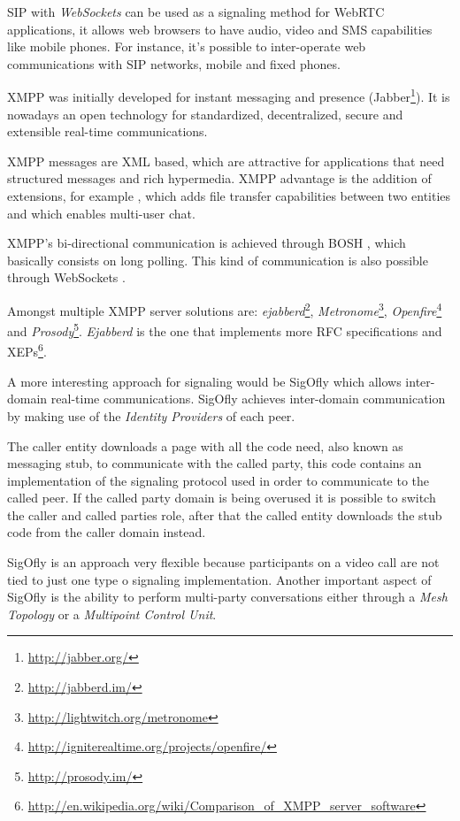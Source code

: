   \ac{SIP} with \emph{WebSockets} can be used as a signaling method for \ac{WebRTC} applications, it allows web browsers to have audio, video and \ac{SMS} capabilities like mobile phones. For instance, it's possible to inter-operate web communications with \ac{SIP} networks, mobile and fixed phones.

  \ac{XMPP} was initially developed for instant messaging and presence (Jabber\footnote{\url{http://jabber.org/}}). It is nowadays an open technology for standardized, decentralized, secure and extensible real-time communications. 

  \ac{XMPP} messages are \ac{XML} based, which are attractive for applications that need structured messages and rich hypermedia. \ac{XMPP} advantage is the addition of extensions, for example \cite{xep0096}, which adds file transfer capabilities between two entities and \cite{xep0045} which enables multi-user chat.

  \ac{XMPP}'s bi-directional communication is achieved through \ac{BOSH} \cite{xep0206}, which basically consists on long polling. This kind of communication is also possible through WebSockets \cite{rfc7395}.

  Amongst multiple XMPP server solutions are: \emph{ejabberd}\footnote{\url{http://jabberd.im/}}, \emph{Metronome}\footnote{\url{http://lightwitch.org/metronome}}, \emph{Openfire}\footnote{\url{http://igniterealtime.org/projects/openfire/}} and \emph{Prosody}\footnote{\url{http://prosody.im/}}. \emph{Ejabberd} is the one that implements more \ac{RFC} specifications and \ac{XEP}s\footnote{\url{http://en.wikipedia.org/wiki/Comparison_of_XMPP_server_software}}.

  A more interesting approach for signaling would be \ac{SigOfly}\cite{sigofly} which allows inter-domain real-time communications. \ac{SigOfly} achieves inter-domain communication by making use of the \emph{Identity Providers} of each peer. 

  The caller entity downloads a page with all the code need, also known as messaging stub, to communicate with the called party, this code contains an implementation of the signaling protocol used in order to communicate to the called peer. If the called party domain is being overused it is possible to switch the caller and called parties role, after that the called entity downloads the stub code from the caller domain instead.

  \ac{SigOfly} is an approach very flexible because participants on a video call are not tied to just one type o signaling implementation. Another important aspect of  \ac{SigOfly} is the ability to perform multi-party conversations either through a \emph{Mesh Topology} or a \emph{Multipoint Control Unit}.


